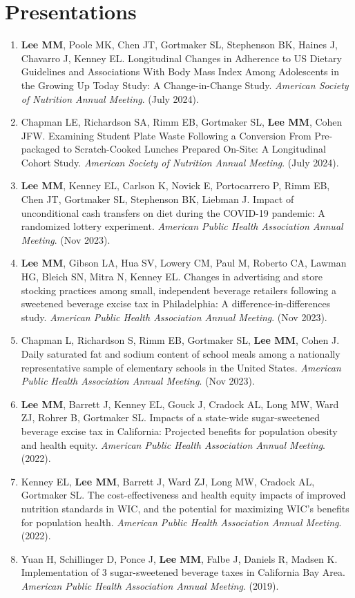 \documentclass{cv_style}
\begin{document}
\section{Presentations}
\begin{enumerate}[leftmargin = 2em]
    \item \textbf{Lee MM}, Poole MK, Chen JT, Gortmaker SL, Stephenson BK, Haines J, Chavarro J, Kenney EL.  Longitudinal Changes in Adherence to US Dietary Guidelines and Associations With Body Mass Index Among Adolescents in the Growing Up Today Study: A Change-in-Change Study.  \textit{American Society of Nutrition Annual Meeting}. (July 2024). 
    \item \parskip 1pt Chapman LE, Richardson SA, Rimm EB, Gortmaker SL, \textbf{Lee MM}, Cohen JFW. Examining Student Plate Waste Following a Conversion From Pre-packaged to Scratch-Cooked Lunches Prepared On-Site: A Longitudinal Cohort Study. \textit{American Society of Nutrition Annual Meeting}. (July 2024). 
    \item \parskip 1pt \textbf{Lee MM}, Kenney EL, Carlson K, Novick E, Portocarrero P, Rimm EB, Chen JT, Gortmaker SL, Stephenson BK, Liebman J. Impact of unconditional cash transfers on diet during the COVID-19 pandemic: A randomized lottery experiment. \textit{American Public Health Association Annual Meeting}. (Nov 2023). 
    \item \parskip 1pt \textbf{Lee MM}, Gibson LA, Hua SV, Lowery CM, Paul M, Roberto CA, Lawman HG, Bleich SN, Mitra N, Kenney EL. Changes in advertising and store stocking practices among small, independent beverage retailers following a sweetened beverage excise tax in Philadelphia: A difference-in-differences study. \textit{American Public Health Association Annual Meeting}. (Nov 2023).  
    \item \parskip 1pt Chapman L, Richardson S, Rimm EB, Gortmaker SL, \textbf{Lee MM}, Cohen J. Daily saturated fat and sodium content of school meals among a nationally representative sample of elementary schools in the United States. \textit{American Public Health Association Annual Meeting}. (Nov 2023). 
    \item \parskip 1pt \textbf{Lee MM}, Barrett J, Kenney EL, Gouck J, Cradock AL, Long MW, Ward ZJ, Rohrer B, Gortmaker SL. Impacts of a state-wide sugar-sweetened beverage excise tax in California: Projected benefits for population obesity and health equity. \textit{American Public Health Association Annual Meeting}. (2022).
    \item \parskip 1pt Kenney EL, \textbf{Lee MM}, Barrett J, Ward ZJ, Long MW, Cradock AL, Gortmaker SL. The cost-effectiveness and health equity impacts of improved nutrition standards in WIC, and the potential for maximizing WIC’s benefits for population health. \textit{American Public Health Association Annual Meeting}. (2022).
    \item \parskip 1pt Yuan H, Schillinger D, Ponce J, \textbf{Lee MM},  Falbe J, Daniels R, Madsen K. Implementation of 3 sugar-sweetened beverage taxes in California Bay Area. \textit{American Public Health Association Annual Meeting}. (2019).
\end{enumerate}
\end{document}
